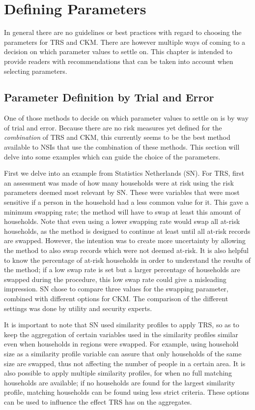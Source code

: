 \chapter{Defining Parameters}\label{ch:params}
In general there are no guidelines or best practices with regard to choosing the parameters for TRS and CKM. There are however multiple ways of coming to a decision on which parameter values to settle on. This chapter is intended to provide readers with recommendations that can be taken into account when selecting parameters.

\section{Parameter Definition by Trial and Error}
One of those methods to decide on  which parameter values to settle on is by way of trial and error. Because there are no risk measures yet defined for the \textit{combination} of TRS and CKM, this currently seems to be the best method available to NSIs that use the combination of these methods. This section will delve into some examples which can guide the choice of the parameters. 

First we delve into an example from Statistics Netherlands (SN). For TRS, first an assessment was made of how many households were at risk using the risk parameters deemed most relevant by SN. These were variables that were most sensitive if a person in the household had a less common value for it. This gave a minimum swapping rate; the method will have to swap at least this amount of households. Note that even using a lower swapping rate would swap all at-risk households, as the method is designed to continue at least until all at-risk records are swapped. However, the intention was to create more uncertainty by allowing the method to also swap records which were not deemed at-risk. It is also helpful to know the percentage of at-risk households in order to understand the results of the method; if a low swap rate is set but a larger percentage of households are swapped during the procedure, this low swap rate could give a misleading impression. SN chose to compare three values for the swapping parameter, combined with different options for CKM. The comparison of the different settings was done by utility and security experts. 

It is important to note that SN used similarity profiles to apply TRS, so as to keep the aggregation of certain variables used in the similarity profiles similar even when households in regions were swapped. For example, using household size as a similarity profile variable can assure that only households of the same size are swapped, thus not affecting the number of people in a certain area. It is also possible to apply multiple similarity profiles, for when no full matching households are available; if no households are found for the largest similarity profile, matching households can be found using less strict criteria. These options can be used to influence the effect TRS has on the aggregates. 

